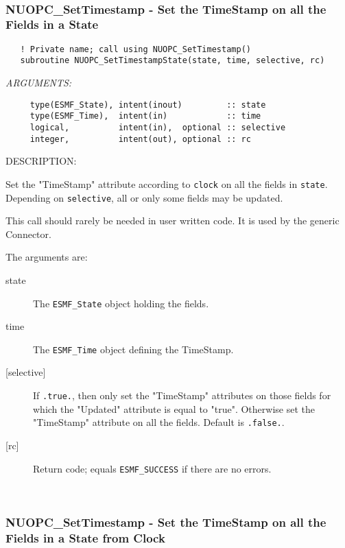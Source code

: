  
\mbox{}\hrulefill\ 
 
\subsubsection [NUOPC\_SetTimestamp] {NUOPC\_SetTimestamp - Set the TimeStamp on all the Fields in a State}


\begin{verbatim}   ! Private name; call using NUOPC_SetTimestamp()
   subroutine NUOPC_SetTimestampState(state, time, selective, rc)\end{verbatim}{\em ARGUMENTS:}
\begin{verbatim}     type(ESMF_State), intent(inout)         :: state
     type(ESMF_Time),  intent(in)            :: time
     logical,          intent(in),  optional :: selective
     integer,          intent(out), optional :: rc\end{verbatim}
{\sf DESCRIPTION:\\ }


     Set the "TimeStamp" attribute according to {\tt clock} on all the fields in
     {\tt state}. Depending on {\tt selective}, all or only some fields may be
     updated.
  
     This call should rarely be needed in user written code. It is used 
     by the generic Connector.
  
     The arguments are:
     \begin{description}
     \item[state]
       The {\tt ESMF\_State} object holding the fields.
     \item[time]
       The {\tt ESMF\_Time} object defining the TimeStamp.
     \item[{[selective]}]
       If {\tt .true.}, then only set the "TimeStamp" attributes on those fields
       for which the "Updated" attribute is equal to "true". Otherwise set the
       "TimeStamp" attribute on all the fields. Default is {\tt .false.}.
     \item[{[rc]}]
       Return code; equals {\tt ESMF\_SUCCESS} if there are no errors.
     \end{description}
   
 
\mbox{}\hrulefill\ 
 
\subsubsection [NUOPC\_SetTimestamp] {NUOPC\_SetTimestamp - Set the TimeStamp on all the Fields in a State from Clock}


